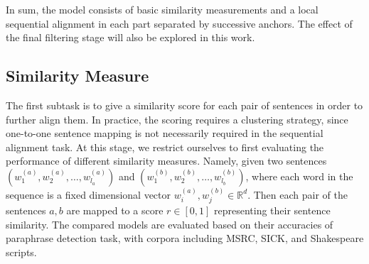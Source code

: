 In sum, the model consists of basic similarity measurements and a local sequential alignment in each part separated by successive anchors. The effect of the final filtering stage will also be explored in this work.


\subsection{Similarity Measure}

The first subtask is to give a similarity score for each pair of sentences in order to further align them. In practice, the scoring requires a clustering strategy, since one-to-one sentence mapping is not necessarily required in the sequential alignment task. At this stage, we restrict ourselves to first evaluating the performance of different similarity measures. Namely, given two sentences $(w_1^{(a)}, w_2^{(a)}, \ldots, w_{l_a}^{(a)})$ and $(w_1^{(b)}, w_2^{(b)}, \ldots, w_{l_b}^{(b)})$, where each word in the sequence is a fixed dimensional vector $w_i^{(a)}, w_j^{(b)}\in \mathbb{R}^d$. Then each pair of the sentences $a, b$ are mapped to a score $r\in [0, 1]$ representing their sentence similarity. The compared models are evaluated based on their accuracies of paraphrase detection task, with corpora including MSRC, SICK, and Shakespeare scripts.

